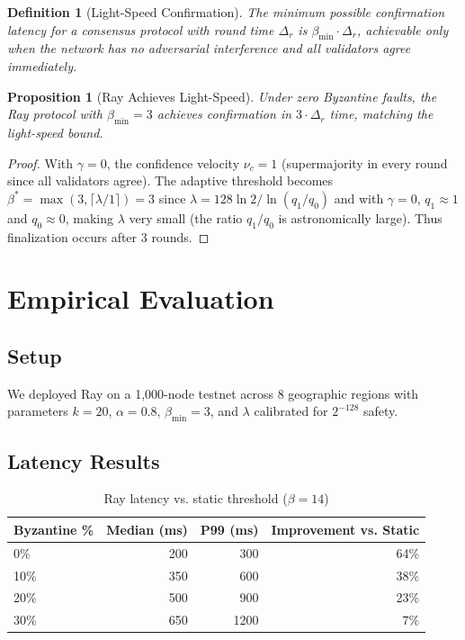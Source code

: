 \documentclass[11pt,a4paper]{article}
\newtheorem{proposition}[theorem]{Proposition}
\newtheorem{definition}{Definition}[section]
\begin{document}
\begin{definition}[Light-Speed Confirmation]
The minimum possible confirmation latency for a consensus protocol with round time
$\Delta_r$ is $\beta_{\min} \cdot \Delta_r$, achievable only when the network has no
adversarial interference and all validators agree immediately.
\end{definition}

\begin{proposition}[Ray Achieves Light-Speed]
\label{prop:lightspeed}
Under zero Byzantine faults, the Ray protocol with $\beta_{\min} = 3$ achieves
confirmation in $3 \cdot \Delta_r$ time, matching the light-speed bound.
\end{proposition}

\begin{proof}
With $\gamma = 0$, the confidence velocity $\nu_c = 1$ (supermajority in every round
since all validators agree). The adaptive threshold becomes $\beta^* = \max(3, \lceil \lambda / 1 \rceil) = 3$
since $\lambda = 128 \ln 2 / \ln(q_1/q_0)$ and with $\gamma = 0$, $q_1 \approx 1$ and
$q_0 \approx 0$, making $\lambda$ very small (the ratio $q_1/q_0$ is astronomically large).
Thus finalization occurs after 3 rounds.
\end{proof}

\section{Empirical Evaluation}
\label{sec:evaluation}

\subsection{Setup}

We deployed Ray on a 1,000-node testnet across 8 geographic regions with parameters
$k = 20$, $\alpha = 0.8$, $\beta_{\min} = 3$, and $\lambda$ calibrated for $2^{-128}$ safety.

\subsection{Latency Results}

\begin{table}[h]
\centering
\begin{tabular}{@{}lrrr@{}}
\toprule
\textbf{Byzantine \%} & \textbf{Median (ms)} & \textbf{P99 (ms)} & \textbf{Improvement vs. Static} \\
\midrule
0\% & 200 & 300 & 64\% \\
10\% & 350 & 600 & 38\% \\
20\% & 500 & 900 & 23\% \\
30\% & 650 & 1200 & 7\% \\
\bottomrule
\end{tabular}
\caption{Ray latency vs. static threshold ($\beta = 14$)}
\label{tab:latency}
\end{table}
\end{document}
